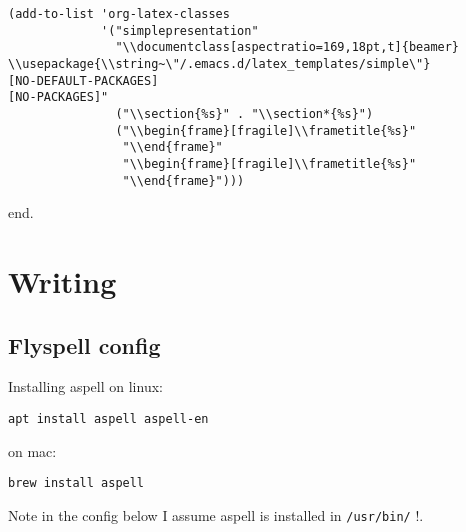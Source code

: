 \documentclass[12pt]{article}
\begin{document}
\lstset{language=Lisp,label= ,caption= ,captionpos=b,numbers=none}
\begin{lstlisting}
(add-to-list 'org-latex-classes
             '("simplepresentation"
               "\\documentclass[aspectratio=169,18pt,t]{beamer}
\\usepackage{\\string~\"/.emacs.d/latex_templates/simple\"}
[NO-DEFAULT-PACKAGES]
[NO-PACKAGES]"
               ("\\section{%s}" . "\\section*{%s}")
               ("\\begin{frame}[fragile]\\frametitle{%s}"
                "\\end{frame}"
                "\\begin{frame}[fragile]\\frametitle{%s}"
                "\\end{frame}")))
\end{lstlisting}

end. 

\section{Writing}
\label{sec:org992444a}

\subsection{Flyspell config}
\label{sec:org63b2b2c}

Installing aspell on linux:

\begin{verbatim}
apt install aspell aspell-en
\end{verbatim}

on mac: 

\begin{verbatim}
brew install aspell 
\end{verbatim}

Note in the config below I assume aspell is installed in \texttt{/usr/bin/} !. 
\end{document}
